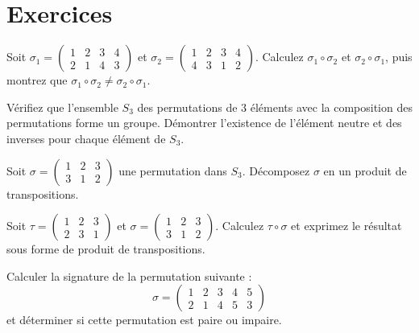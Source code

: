 \section{Exercices}

\begin{exercice}
Soit \( \sigma_1 = \begin{pmatrix} 1 & 2 & 3 & 4 \\ 2 & 1 & 4 & 3 \end{pmatrix} \) et \( \sigma_2 = \begin{pmatrix} 1 & 2 & 3 & 4 \\ 4 & 3 & 1 & 2 \end{pmatrix} \). Calculez \( \sigma_1 \circ \sigma_2 \) et \( \sigma_2 \circ \sigma_1 \), puis montrez que \( \sigma_1 \circ \sigma_2 \neq \sigma_2 \circ \sigma_1 \).
\end{exercice}

\begin{exercice}
Vérifiez que l'ensemble \( S_3 \) des permutations de 3 éléments avec la composition des permutations forme un groupe. Démontrer l'existence de l'élément neutre et des inverses pour chaque élément de \( S_3 \).
\end{exercice}

\begin{exercice}
Soit \( \sigma = \begin{pmatrix} 1 & 2 & 3 \\ 3 & 1 & 2 \end{pmatrix} \) une permutation dans \( S_3 \). Décomposez \( \sigma \) en un produit de transpositions.
\end{exercice}

\begin{exercice}
Soit \( \tau = \begin{pmatrix} 1 & 2 & 3 \\ 2 & 3 & 1 \end{pmatrix} \) et \( \sigma = \begin{pmatrix} 1 & 2 & 3 \\ 3 & 1 & 2 \end{pmatrix} \). Calculez \( \tau \circ \sigma \) et exprimez le résultat sous forme de produit de transpositions.
\end{exercice}

\begin{exercice}
Calculer la signature de la permutation suivante :
\[
\sigma = \begin{pmatrix} 1 & 2 & 3 & 4 & 5 \\ 2 & 1 & 4 & 5 & 3 \end{pmatrix}
\]
et déterminer si cette permutation est paire ou impaire.
\end{exercice}

